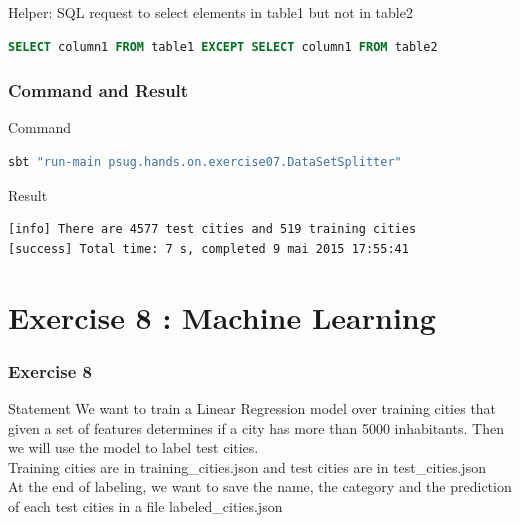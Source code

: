\documentclass[slidetop,9pt,utf8]{beamer}
\begin{document}
\begin{CJK}{UTF8}{gbsn}
\begin{frame}[fragile]
  \begin{block}{Helper: SQL request to select elements in table1 but not in table2}
    \begin{lstlisting}[language=sql]
SELECT column1 FROM table1 EXCEPT SELECT column1 FROM table2
    \end{lstlisting}
  \end{block}

\end{frame}

\begin{frame}[fragile]
  \frametitle{Command and Result}

  \begin{block}{Command}
    \begin{lstlisting}[language=bash, style=terminal-medium]
sbt "run-main psug.hands.on.exercise07.DataSetSplitter"  
    \end{lstlisting}
  \end{block}

  \begin{block}{Result}
    \begin{lstlisting}[language=bash, style=terminal]
[info] There are 4577 test cities and 519 training cities
[success] Total time: 7 s, completed 9 mai 2015 17:55:41
    \end{lstlisting}
  \end{block}

\end{frame}

%
%
%
%

\section{Exercise 8 : Machine Learning}

\begin{frame}
  \frametitle{Exercise 8}

  \begin{block}{Statement}
    We want to train a Linear Regression model over training cities that given a set of features determines if a city has more than 5000 inhabitants. Then we will use the model to label test cities. 
\\ \medskip
Training cities are in training\_cities.json and test cities are in test\_cities.json
\\ \medskip
At the end of labeling, we want to save the name, the category and the prediction of each test cities in a file labeled\_cities.json
  \end{block}


\end{frame}
\end{CJK}
\end{document}
